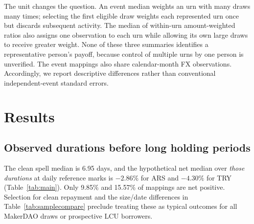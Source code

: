 \documentclass[sn-vancouver,Numbered]{sn-jnl}
\begin{document}
The unit changes the question. An event median weights an urn with many draws many times; selecting the first eligible draw weights each represented urn once but discards subsequent activity. The median of within-urn amount-weighted ratios also assigns one observation to each urn while allowing its own large draws to receive greater weight. None of these three summaries identifies a representative person's payoff, because control of multiple urns by one person is unverified. The event mappings also share calendar-month FX observations. Accordingly, we report descriptive differences rather than conventional independent-event standard errors.

\section{Results}
\subsection{Observed durations before long holding periods}
\begin{table}[t]
\caption{Two descriptive mappings with different samples and FX frequency. The observed-duration column uses 7,105 selected repaid spells and daily references; fixed columns use every eligible draw and OECD/FRED monthly means. Values are percentages apart from the spell count. The 20\% effective annual rate, 0.5\% opening fee, 0.3\% conversion each way and USD 40 round-trip gas are illustrative. Table~\ref{tab:samesample} holds the clean sample constant when comparing horizons.}
\label{tab:main}\centering\small

\end{table}
The clean spell median is 6.95 days, and the hypothetical net median over \emph{those durations} at daily reference marks is $-2.86\%$ for ARS and $-4.30\%$ for TRY (Table~\ref{tab:main}). Only 9.85\% and 15.57\% of mappings are net positive. Selection for clean repayment and the size/date differences in Table~\ref{tab:samplecompare} preclude treating these as typical outcomes for all MakerDAO draws or prospective LCU borrowers.
\end{document}
